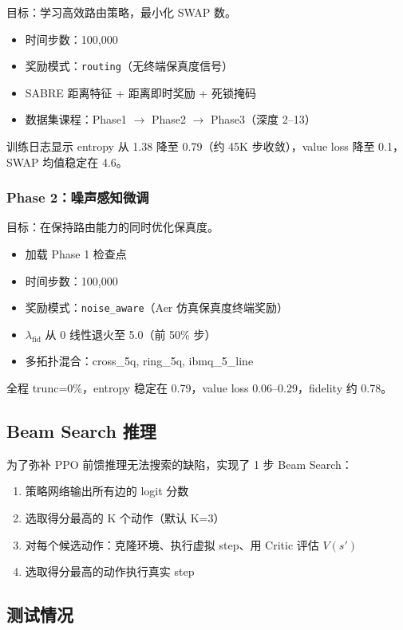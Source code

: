 目标：学习高效路由策略，最小化 SWAP 数。
\begin{itemize}
  \item 时间步数：100,000
  \item 奖励模式：\texttt{routing}（无终端保真度信号）
  \item SABRE 距离特征 + 距离即时奖励 + 死锁掩码
  \item 数据集课程：Phase1 $\to$ Phase2 $\to$ Phase3（深度 2--13）
\end{itemize}

训练日志显示 entropy 从 1.38 降至 0.79（约 45K 步收敛），value loss 降至 0.1，SWAP 均值稳定在 4.6。

\subsubsection{Phase 2：噪声感知微调}

目标：在保持路由能力的同时优化保真度。
\begin{itemize}
  \item 加载 Phase 1 检查点
  \item 时间步数：100,000
  \item 奖励模式：\texttt{noise\_aware}（Aer 仿真保真度终端奖励）
  \item $\lambda_{\text{fid}}$ 从 0 线性退火至 5.0（前 50\% 步）
  \item 多拓扑混合：cross\_5q, ring\_5q, ibmq\_5\_line
\end{itemize}

全程 trunc=0\%，entropy 稳定在 0.79，value loss 0.06--0.29，fidelity 约 0.78。

\subsection{Beam Search 推理}

为了弥补 PPO 前馈推理无法搜索的缺陷，实现了 1 步 Beam Search：
\begin{enumerate}
  \item 策略网络输出所有边的 logit 分数
  \item 选取得分最高的 K 个动作（默认 K=3）
  \item 对每个候选动作：克隆环境、执行虚拟 step、用 Critic 评估 $V(s')$
  \item 选取得分最高的动作执行真实 step
\end{enumerate}

\subsection{测试情况}

